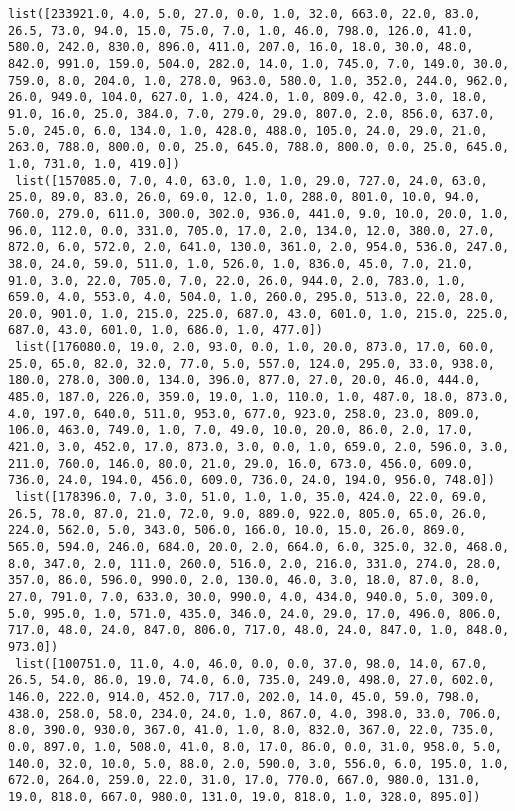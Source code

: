 \documentclass[11pt]{article}
\begin{document}
\begin{Verbatim}[commandchars=\\\{\}]
 list([233921.0, 4.0, 5.0, 27.0, 0.0, 1.0, 32.0, 663.0, 22.0, 83.0, 26.5, 73.0, 94.0, 15.0, 75.0, 7.0, 1.0, 46.0, 798.0, 126.0, 41.0, 580.0, 242.0, 830.0, 896.0, 411.0, 207.0, 16.0, 18.0, 30.0, 48.0, 842.0, 991.0, 159.0, 504.0, 282.0, 14.0, 1.0, 745.0, 7.0, 149.0, 30.0, 759.0, 8.0, 204.0, 1.0, 278.0, 963.0, 580.0, 1.0, 352.0, 244.0, 962.0, 26.0, 949.0, 104.0, 627.0, 1.0, 424.0, 1.0, 809.0, 42.0, 3.0, 18.0, 91.0, 16.0, 25.0, 384.0, 7.0, 279.0, 29.0, 807.0, 2.0, 856.0, 637.0, 5.0, 245.0, 6.0, 134.0, 1.0, 428.0, 488.0, 105.0, 24.0, 29.0, 21.0, 263.0, 788.0, 800.0, 0.0, 25.0, 645.0, 788.0, 800.0, 0.0, 25.0, 645.0, 1.0, 731.0, 1.0, 419.0])
 list([157085.0, 7.0, 4.0, 63.0, 1.0, 1.0, 29.0, 727.0, 24.0, 63.0, 25.0, 89.0, 83.0, 26.0, 69.0, 12.0, 1.0, 288.0, 801.0, 10.0, 94.0, 760.0, 279.0, 611.0, 300.0, 302.0, 936.0, 441.0, 9.0, 10.0, 20.0, 1.0, 96.0, 112.0, 0.0, 331.0, 705.0, 17.0, 2.0, 134.0, 12.0, 380.0, 27.0, 872.0, 6.0, 572.0, 2.0, 641.0, 130.0, 361.0, 2.0, 954.0, 536.0, 247.0, 38.0, 24.0, 59.0, 511.0, 1.0, 526.0, 1.0, 836.0, 45.0, 7.0, 21.0, 91.0, 3.0, 22.0, 705.0, 7.0, 22.0, 26.0, 944.0, 2.0, 783.0, 1.0, 659.0, 4.0, 553.0, 4.0, 504.0, 1.0, 260.0, 295.0, 513.0, 22.0, 28.0, 20.0, 901.0, 1.0, 215.0, 225.0, 687.0, 43.0, 601.0, 1.0, 215.0, 225.0, 687.0, 43.0, 601.0, 1.0, 686.0, 1.0, 477.0])
 list([176080.0, 19.0, 2.0, 93.0, 0.0, 1.0, 20.0, 873.0, 17.0, 60.0, 25.0, 65.0, 82.0, 32.0, 77.0, 5.0, 557.0, 124.0, 295.0, 33.0, 938.0, 180.0, 278.0, 300.0, 134.0, 396.0, 877.0, 27.0, 20.0, 46.0, 444.0, 485.0, 187.0, 226.0, 359.0, 19.0, 1.0, 110.0, 1.0, 487.0, 18.0, 873.0, 4.0, 197.0, 640.0, 511.0, 953.0, 677.0, 923.0, 258.0, 23.0, 809.0, 106.0, 463.0, 749.0, 1.0, 7.0, 49.0, 10.0, 20.0, 86.0, 2.0, 17.0, 421.0, 3.0, 452.0, 17.0, 873.0, 3.0, 0.0, 1.0, 659.0, 2.0, 596.0, 3.0, 211.0, 760.0, 146.0, 80.0, 21.0, 29.0, 16.0, 673.0, 456.0, 609.0, 736.0, 24.0, 194.0, 456.0, 609.0, 736.0, 24.0, 194.0, 956.0, 748.0])
 list([178396.0, 7.0, 3.0, 51.0, 1.0, 1.0, 35.0, 424.0, 22.0, 69.0, 26.5, 78.0, 87.0, 21.0, 72.0, 9.0, 889.0, 922.0, 805.0, 65.0, 26.0, 224.0, 562.0, 5.0, 343.0, 506.0, 166.0, 10.0, 15.0, 26.0, 869.0, 565.0, 594.0, 246.0, 684.0, 20.0, 2.0, 664.0, 6.0, 325.0, 32.0, 468.0, 8.0, 347.0, 2.0, 111.0, 260.0, 516.0, 2.0, 216.0, 331.0, 274.0, 28.0, 357.0, 86.0, 596.0, 990.0, 2.0, 130.0, 46.0, 3.0, 18.0, 87.0, 8.0, 27.0, 791.0, 7.0, 633.0, 30.0, 990.0, 4.0, 434.0, 940.0, 5.0, 309.0, 5.0, 995.0, 1.0, 571.0, 435.0, 346.0, 24.0, 29.0, 17.0, 496.0, 806.0, 717.0, 48.0, 24.0, 847.0, 806.0, 717.0, 48.0, 24.0, 847.0, 1.0, 848.0, 973.0])
 list([100751.0, 11.0, 4.0, 46.0, 0.0, 0.0, 37.0, 98.0, 14.0, 67.0, 26.5, 54.0, 86.0, 19.0, 74.0, 6.0, 735.0, 249.0, 498.0, 27.0, 602.0, 146.0, 222.0, 914.0, 452.0, 717.0, 202.0, 14.0, 45.0, 59.0, 798.0, 438.0, 258.0, 58.0, 234.0, 24.0, 1.0, 867.0, 4.0, 398.0, 33.0, 706.0, 8.0, 390.0, 930.0, 367.0, 41.0, 1.0, 8.0, 832.0, 367.0, 22.0, 735.0, 0.0, 897.0, 1.0, 508.0, 41.0, 8.0, 17.0, 86.0, 0.0, 31.0, 958.0, 5.0, 140.0, 32.0, 10.0, 5.0, 88.0, 2.0, 590.0, 3.0, 556.0, 6.0, 195.0, 1.0, 672.0, 264.0, 259.0, 22.0, 31.0, 17.0, 770.0, 667.0, 980.0, 131.0, 19.0, 818.0, 667.0, 980.0, 131.0, 19.0, 818.0, 1.0, 328.0, 895.0])

\end{Verbatim}
\end{document}
